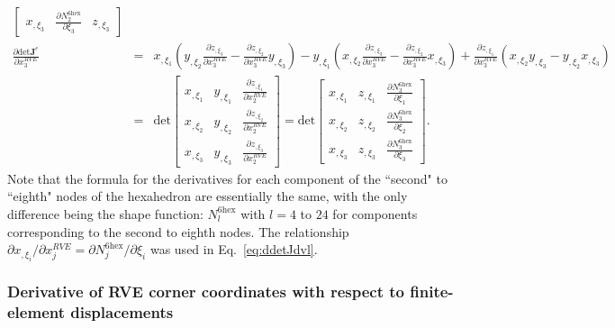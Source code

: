\begin{eqnarray}
\begin{bmatrix}
x_{,\xi_3} & \frac{\partial N_2^{6\text{hex}}}{\partial \xi_3} &  z_{,\xi_3}
\end{bmatrix} \nonumber\\
\frac{\partial \text{det}\pmb{J}^e}{\partial x_3^{RVE}} &=& x_{,\xi_1}\left(y_{,\xi_2} \frac{\partial z_{,\xi_3}}{\partial x_3^{RVE}} - \frac{\partial z_{,\xi_2}}{\partial x_3^{RVE}} y_{,\xi_3} \right) - y_{,\xi_1}\left(x_{,\xi_2}\frac{\partial z_{,\xi_3}}{\partial x_3^{RVE}} - \frac{\partial z_{,\xi_2}}{\partial x_3^{RVE}} x_{,\xi_3} \right) + \frac{\partial z_{,\xi_1}}{\partial x_3^{RVE}}\left(x_{,\xi_2}y_{,\xi_3}-y_{,\xi_2}x_{,\xi_3} \right) \nonumber\\
%
&=& \text{det} \begin{bmatrix}
x_{,\xi_1} & y_{,\xi_1} & \frac{\partial z_{,\xi_1}}{\partial x_2^{RVE}}  \\
x_{,\xi_2} & y_{,\xi_2} & \frac{\partial z_{,\xi_2}}{\partial x_2^{RVE}}  \\
x_{,\xi_3} & y_{,\xi_3} & \frac{\partial z_{,\xi_3}}{\partial x_2^{RVE}} 
\end{bmatrix} 
%
= \text{det} \begin{bmatrix}
x_{,\xi_1} & z_{,\xi_1} & \frac{\partial N_3^{6\text{hex}}}{\partial \xi_1}  \\
x_{,\xi_2} & z_{,\xi_2} & \frac{\partial N_3^{6\text{hex}}}{\partial \xi_2}  \\
x_{,\xi_3} & z_{,\xi_3}& \frac{\partial N_3^{6\text{hex}}}{\partial \xi_3} 
\end{bmatrix} .
\label{eq:ddetJdvl}
\end{eqnarray}
%
Note that the formula for the derivatives for each component of the ``second" to ``eighth" nodes of the hexahedron are essentially the same, with the only difference being the shape function: $N_{l}^{6\text{hex}}$ with $l=4$ to $24$ for components corresponding to the second to eighth nodes. The relationship $\partial x_{,\xi_i}/\partial x_j^{RVE} = \partial N_j^{6\text{hex}}/\partial \xi_i$ was used in Eq.\ \eqref{eq:ddetJdvl}.

\subsubsection{Derivative of RVE corner coordinates with respect to finite-element displacements}

